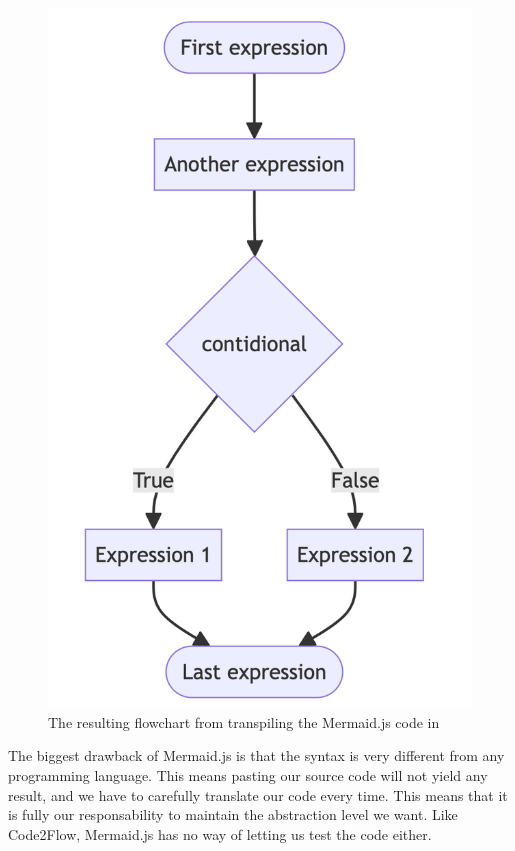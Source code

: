 \begin{figure}[ht]
    \centering
    \includegraphics[scale=.4]{assets/mermaidjs.png}
    \caption{The resulting flowchart from transpiling the Mermaid.js code in }
    \label{A mermaid.js flowchart.}
\end{figure}

The biggest drawback of Mermaid.js is that the syntax is very different from any programming language. This means pasting our source code will not yield any result, and we have to carefully translate our code every time. This means that it is fully our responsability to maintain the abstraction level we want. Like Code2Flow, Mermaid.js has no way of letting us test the code either.
